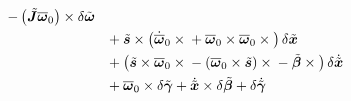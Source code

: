 \documentclass[10pt,dvips,fleqn,subeqn]{report}
\newcommand{\T}[1]{\bm{#1}}
\newcommand{\TT}[1]{\bm{#1}}
\begin{document}
\begin{subequations}
\begin{align}
{		- \plbr{\tilde{\TT{J}} \overline{\T{\omega}}_0} \times{}
	} \delta\tilde{\T{\omega}}
	\nonumber \\
	&\hphantom{=}
	+ \tilde{\T{s}} \times \plbr{
		\dot{\overline{\T{\omega}}}_0 \times{}
		+ \overline{\T{\omega}}_0 \times \overline{\T{\omega}}_0 \times{}
	} \delta\tilde{\T{x}}
	\nonumber \\
	&\hphantom{=}
	+ \plbr{
		\tilde{\T{s}} \times \overline{\T{\omega}}_0 \times{}
		- \plbr{\overline{\T{\omega}}_0 \times \tilde{\T{s}}} \times{}
		- \tilde{\T{\beta}} \times{}
	} \delta\dot{\tilde{\T{x}}}
	\nonumber \\
	&\hphantom{=}
	+ \overline{\T{\omega}}_0 \times \delta\tilde{\T{\gamma}}
	+ \dot{\tilde{\T{x}}} \times \delta\tilde{\T{\beta}}
	+ \delta\dot{\tilde{\T{\gamma}}}
\end{align}
\end{subequations}
\end{document}
